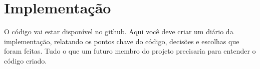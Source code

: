 \chapter{Implementação}
\label{cap:Implementação}

O código vai estar disponível no github. Aqui você deve criar um diário
da implementação, relatando os pontos chave do código, decisões e escolhas
que foram feitas. Tudo o que um futuro membro do projeto precisaria para
entender o código criado.
